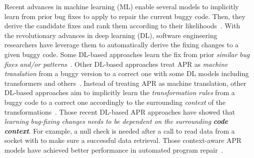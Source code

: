 Recent advances in machine learning (ML) enable several models to
implicitly learn from prior bug fixes to apply to repair the current
buggy code. Then, they derive the candidate fixes and rank them
according to their
likelihoods~\cite{long2016automatic,long2017automatic,saha2017elixir}.
With the revolutionary advances in deep learning (DL), software
engineering researchers have leverage them to automatically derive the
fixing changes to a given buggy code. Some DL-based approaches learn
the fix from prior {\em similar bug fixes and/or
  patterns}~\cite{gupta2017deepfix,white2019sorting,white2016deep}.
Other DL-based approaches treat APR as {\em machine translation} from
a buggy version to a correct one with some DL models including
transformers and
others~\cite{chakrabortycodit,chen2018sequencer,hata2018learning,tufano2018empirical,see2017get}. Instead
of treating APR as machine translation, other DL-based approaches aim
to implicitly learn the {\em transformation rules} from a buggy code
to a correct one accordingly to the surrounding {\em context} of the
transformations~\cite{icse20,tufano2019learning,cure-icse21}. Those
recent DL-based APR approaches have showed that {\em learning
  bug-fixing changes needs to be dependent on the surrounding {\bf
    code context}}.  For example, a null check is needed after a call
to read data from a socket with  to make
sure a successful data retrieval. Those context-aware APR models have
achieved better performance in
automated program repair~\cite{icse20,tufano2019learning,chakrabortycodit}.

